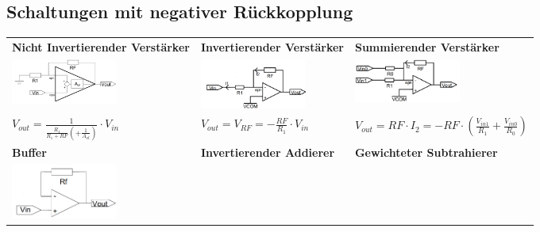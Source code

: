 \documentclass[margin=normal]{tex/hsrzf}
\begin{document}
\subsection{Schaltungen mit negativer Rückkopplung}
\begingroup
  \small
  \begin{tabularx}{0.8\textwidth}{p{155pt}p{155pt}p{155pt}}
    \textbf{Nicht Invertierender Verstärker}                                                          &
    \textbf{Invertierender Verstärker}                                                                &
    \textbf{Summierender Verstärker}                                                                    \\
    \includegraphics[width = 3.5cm]{img/OpAmp/Verstaerker_nicht_invertierend.png}                     &
    \includegraphics[width = 3.5cm]{img/OpAmp/Verstaerker_invertierend.png}                           &
    \includegraphics[width = 3.5cm]{img/OpAmp/Verstaerker_summierend.png}                               \\
    $ V_{out} = \frac{1}{\frac{R_1}{R_1 + RF} (+ \frac{1}{A_{ol}})} \cdot V_{in} $                    &
    $ V_{out} = V_{RF} = -\frac{RF}{R_1}\cdot V_{in}$                                                 &
    $ V_{out} = RF \cdot I_2 = -RF \cdot (\frac{V_{in1}}{R_1} + \frac{V_{in0}}{R_0}) $                  \\
    \textbf{Buffer}                                                                                   &
    \textbf{Invertierender Addierer}                                                                  &
    \textbf{Gewichteter Subtrahierer}                                                                   \\
    \includegraphics[width = 3.5cm]{img/OpAmp/Buffer.png}                                             &

\end{tabularx}
\end{document}
